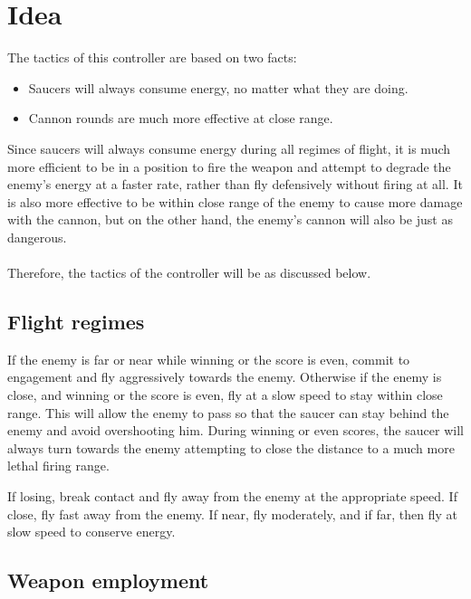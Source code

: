 \newpage

\section{Idea}

The tactics of this controller are based on two facts:

\begin{itemize}
	\item Saucers will always consume energy, no matter what they are doing.
	\item Cannon rounds are much more effective at close range.
\end{itemize}

Since saucers will always consume energy during all regimes of flight, it is much more efficient to be in a position to fire the weapon and attempt to degrade the enemy's energy at a faster rate, rather than fly defensively without firing at all. It is also more effective to be within close range of the enemy to cause more damage with the cannon, but on the other hand, the enemy's cannon will also be just as dangerous.\\
\\
Therefore, the tactics of the controller will be as discussed below.

\subsection{Flight regimes}

If the enemy is far or near while winning or the score is even, commit to engagement and fly aggressively towards the enemy. Otherwise if the enemy is close, and winning or the score is even, fly at a slow speed to stay within close range. This will allow the enemy to pass so that the saucer can stay behind the enemy and avoid overshooting him. During winning or even scores, the saucer will always turn towards the enemy attempting to close the distance to a much more lethal firing range.

If losing, break contact and fly away from the enemy at the appropriate speed. If close, fly fast away from the enemy. If near, fly moderately, and if far, then fly at slow speed to conserve energy.

\subsection{Weapon employment}